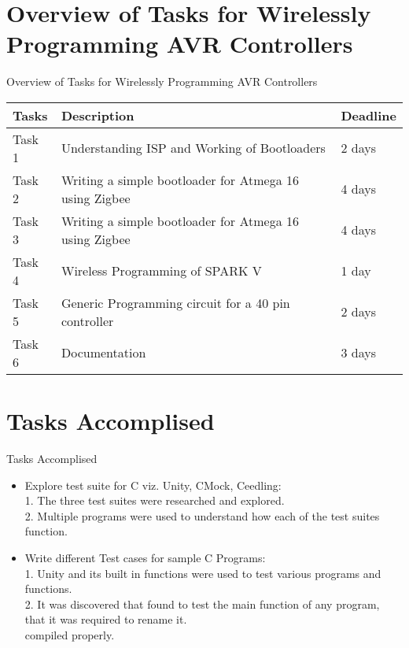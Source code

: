 \documentclass[10pt, a4paper]{beamer}
\begin{document}
\section{Overview of Tasks for Wirelessly Programming AVR Controllers}
\begin{frame}{Overview of Tasks for Wirelessly Programming AVR Controllers}
	\begin{center}
	\begin{tabular}{ |p{2cm}|p{5cm}|p{1.5cm}| }
	\hline
 	 Tasks & Description & Deadline \\
	\hline
 	 Task 1 & Understanding ISP and Working of Bootloaders & 2 days \\ 
	\hline
	 Task 2 & Writing a simple bootloader for Atmega 16 using Zigbee & 4 days \\ 
	\hline
	 Task 3 & Writing a simple bootloader for Atmega 16 using Zigbee & 4 days \\ 
	\hline
	 Task 4 & Wireless Programming of SPARK V & 1 day \\ 
	\hline
	 Task 5 & Generic Programming circuit for a 40 pin controller & 2 days \\ 
	 \hline
	 Task 6 & Documentation & 3 days \\ 
	\hline
	\end{tabular}
	\end{center}
\end{frame}


\section{Tasks Accomplised}
\begin{frame}{Tasks Accomplised}
	\begin{itemize}
	  \item Explore test suite for C viz. Unity, CMock, Ceedling:\\
	  \hspace{.1cm} 1. The three test suites were researched and explored. \\
          \hspace{.1cm} 2. Multiple programs were used to understand how each of the test suites function. \\
	  \item Write different Test cases for sample C Programs:\\
	  \hspace{.1cm} 1. Unity and its built in functions were used to test various programs and functions. \\
          \hspace{.1cm} 2. It was discovered that found to test the main function of any program, that it was required to rename it. \\
 compiled properly. \\
	\end{itemize}
\end{frame}
\end{document}

